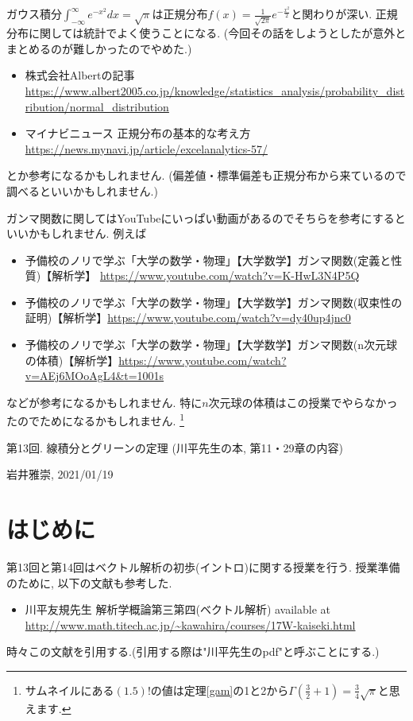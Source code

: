 \documentclass[dvipdfmx,a4paper,11pt]{article}
\theoremstyle{definition}
\begin{document}
 \vspace{11pt}
 
ガウス積分$ \int_{-\infty}^{\infty} e^{-x^2}dx = \sqrt{\pi}$は正規分布$f(x)=\frac{1}{\sqrt{2\pi}}e^{-\frac{x^2}{2}}$と関わりが深い.
正規分布に関しては統計でよく使うことになる. (今回その話をしようとしたが意外とまとめるのが難しかったのでやめた.)
\begin{itemize}
\item 株式会社Albertの記事 \url{https://www.albert2005.co.jp/knowledge/statistics_analysis/probability_distribution/normal_distribution}
\item マイナビニュース 正規分布の基本的な考え方 \url{https://news.mynavi.jp/article/excelanalytics-57/} 
\end{itemize}

とか参考になるかもしれません. (偏差値・標準偏差も正規分布から来ているので調べるといいかもしれません.)

ガンマ関数に関してはYouTubeにいっぱい動画があるのでそちらを参考にするといいかもしれません.
例えば
\begin{itemize}
\item 予備校のノリで学ぶ「大学の数学・物理」【大学数学】ガンマ関数(定義と性質)【解析学】 \url{https://www.youtube.com/watch?v=K-HwL3N4P5Q}
\item 予備校のノリで学ぶ「大学の数学・物理」【大学数学】ガンマ関数(収束性の証明)【解析学】\url{https://www.youtube.com/watch?v=dy40up4jnc0}
\item 予備校のノリで学ぶ「大学の数学・物理」【大学数学】ガンマ関数(n次元球の体積)【解析学】\url{https://www.youtube.com/watch?v=AEj6MOoAgL4&t=1001s}
\end{itemize}
などが参考になるかもしれません.
特に$n$次元球の体積はこの授業でやらなかったのでためになるかもしれません.
\footnote{サムネイルにある$(1.5)!$の値は定理\ref{gam}の1と2から$\Gamma(\frac{3}{2}+1)=\frac{3}{4}\sqrt{\pi}$と思えます.}

\newpage

\begin{center}
{\Large 第13回. 線積分とグリーンの定理  (川平先生の本, 第11・29章の内容)}
\end{center}

\begin{flushright}
 岩井雅崇, 2021/01/19
\end{flushright}


\section{はじめに}
第13回と第14回はベクトル解析の初歩(イントロ)に関する授業を行う.
授業準備のために, 以下の文献も参考した.
\begin{itemize}
\item 川平友規先生 解析学概論第三第四(ベクトル解析) available at \url{http://www.math.titech.ac.jp/~kawahira/courses/17W-kaiseki.html}
\end{itemize}
時々この文献を引用する.(引用する際は"川平先生のpdf"と呼ぶことにする.)
\end{document}
